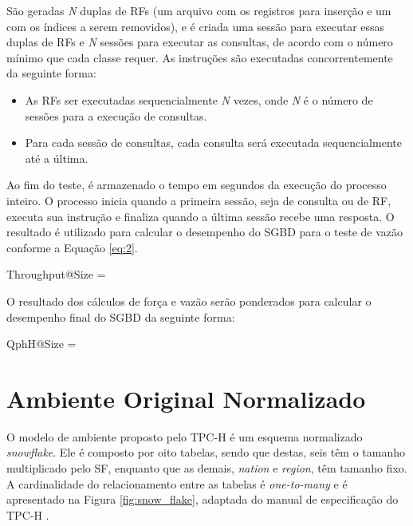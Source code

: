 São geradas \textit{N} duplas de RFs (um arquivo com os registros para inserção e um com os índices a serem removidos), e é criada uma sessão para executar essas duplas de RFs e \textit{N} sessões para executar as consultas, de acordo com o número mínimo que cada classe requer. As instruções são executadas concorrentemente da seguinte forma:

\begin{itemize}
	\item As RFs ser executadas sequencialmente \textit{N} vezes, onde \textit{N} é o número de sessões para a execução de consultas.
	\item Para cada sessão de consultas, cada consulta será executada sequencialmente até a última.
\end{itemize}

Ao fim do teste, é armazenado o tempo em segundos da execução do processo inteiro. O processo inicia quando a primeira sessão, seja de consulta ou de RF, executa sua instrução e finaliza quando a última sessão recebe uma resposta. O resultado é utilizado para calcular o desempenho do SGBD para o teste de vazão conforme a Equação \ref{eq:2}.

\begin{myequation}%
\label{eq:2}
{\scriptstyle Throughput@Size} =  %
\end{myequation}
%

O resultado dos cálculos de força e vazão serão ponderados para calcular o desempenho final do SGBD da seguinte forma:

\begin{myequation}%
\label{eq:3}
{ \scriptstyle QphH@Size =  } %
\end{myequation}
%

\section{Ambiente Original Normalizado}
\label{ambiente_1}

O modelo de ambiente proposto pelo TPC-H é um esquema normalizado \textit{snowflake}. Ele é composto por oito tabelas, sendo que destas, seis têm o tamanho multiplicado pelo SF, enquanto que as demais, \textit{nation} e \textit{region}, têm tamanho fixo. A cardinalidade do relacionamento entre as tabelas é \textit{one-to-many} e é apresentado na Figura \ref{fig:snow_flake}, adaptada do manual de especificação do TPC-H \cite{tpc2017specs}.

